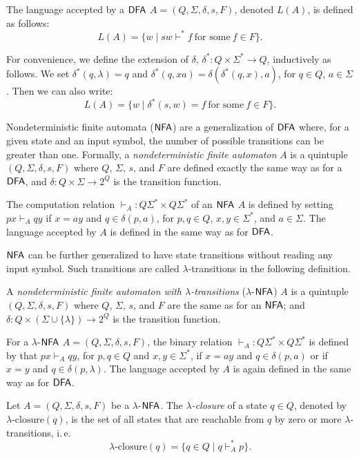 The language accepted by a $\textup{\sf DFA}$ $A = (Q, \Sigma, \delta, s, F)$, denoted $L(A)$, is defined as follows:
$$L(A) = \{w \mid sw \vdash^* f \ \text{for some} \ f \in F\}.$$

For convenience, we define the extension of $\delta$, $\delta^*: Q \times \Sigma^* \to Q$, inductively as follows. We set $\delta^*(q, \lambda) = q$ and $\delta^*(q, xa) = \delta(\delta^*(q, x), a)$, for $q \in Q$, $a \in \Sigma$. Then we can also write:
$$L(A) = \{w \mid \delta^*(s, w) = f \ \text{for some} \ f \in F\}.$$

Nondeterministic finite automata \index{$\NFA$}($\NFA$) are a generalization of $\textup{\sf DFA}$ where, for a given state and an input symbol, the number of possible transitions can be greater than one. Formally, a  \emph{nondeterministic finite automaton} $A$ is a quintuple $(Q, \Sigma, \delta, s, F)$ where $Q$, $\Sigma$, $s$, and $F$ are defined exactly the same way as for a $\textup{\sf DFA}$, and $\delta: Q \times \Sigma \to 2^Q$ is the transition function.

The computation relation $\vdash_A: Q \Sigma^* \times Q \Sigma^*$ of an $\NFA$ $A$ is defined by setting $px \vdash_A qy$ if $x = ay$ and $q \in \delta(p, a)$, for $p, q \in Q$, $x, y \in \Sigma^*$, and $a \in \Sigma$. The language accepted by $A$ is defined in the same way as for $\textup{\sf DFA}$.

$\NFA$ can be further generalized to have state transitions without reading any input symbol. Such transitions are called  $\lambda$-transitions in the following definition.

A \emph{nondeterministic finite automaton with $\lambda$-transitions} \index{$\lambda$-$\NFA$}($\lambda$-$\NFA$) $A$ is a quintuple $(Q, \Sigma, \delta, s, F)$ where $Q$, $\Sigma$, $s$, and $F$ are the same as for an $\NFA$; and $\delta: Q \times (\Sigma \cup \{\lambda\}) \to 2^Q$ is the transition function.

For a $\lambda$-$\NFA$ $A = (Q, \Sigma, \delta, s, F)$, the binary relation $\vdash_A: Q \Sigma^* \times Q \Sigma^*$ is defined by that $px \vdash_A qy$, for $p, q \in Q$ and $x, y \in \Sigma^*$, if $x = ay$ and $q \in \delta(p, a)$ or if $x = y$ and $q \in \delta(p, \lambda)$. The language accepted by $A$ is again defined in the same way as for $\textup{\sf DFA}$.

Let $A = (Q, \Sigma, \delta, s, F)$ be a $\lambda$-$\NFA$. The \emph{$\lambda$-closure} of a state $q \in Q$, denoted by $\lambda \text{-closure}(q)$, is the set of all states that are reachable from $q$ by zero or more $\lambda$-transitions, i.\,e.
$$\lambda \text{-closure}(q) = \{q \in Q \mid q \vdash_A^* p \}.$$

